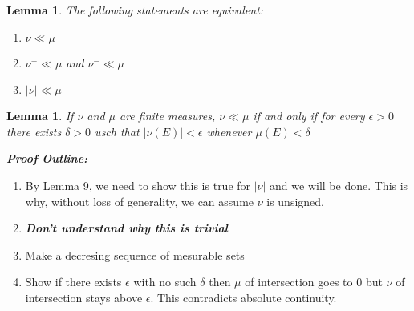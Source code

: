 \documentclass[notoc]{tufte-book}
\newtheorem{lemma}[theorem]{Lemma}
\begin{document}
\begin{lemma}
	The following statements are equivalent:
	\begin{enumerate}
		\item $\nu\ll\mu$
		\item $\nu^+\ll\mu$ and $\nu^-\ll\mu$
		\item $|\nu|\ll\mu$ 
	\end{enumerate}
\end{lemma}
\begin{lemma}
	If $\nu$ and $\mu$ are finite measures, $\nu\ll\mu$ if and only if for every $\epsilon>0$ there exists $\delta>0$ usch that $|\nu(E)|<\epsilon$ whenever $\mu(E)<\delta$ 
\end{lemma}\noindent
\textit{\textbf{Proof Outline: }}
\begin{enumerate}
	\item By Lemma 9, we need to show this is true for $|\nu|$ and we will be done. This is why, without loss of generality, we can assume $\nu$ is unsigned.
	\item \textbf{\textit{Don't understand why this is trivial}}
	\item Make a decresing sequence of mesurable sets
	\item Show if there exists $\epsilon$ with no such $\delta$ then $\mu$ of intersection goes to 0 but $\nu$ of intersection stays above $\epsilon$. This contradicts absolute continuity.
\end{enumerate}
\end{document}
